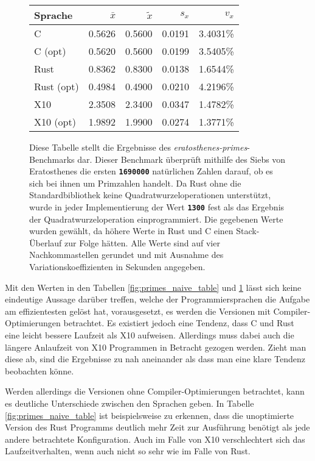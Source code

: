 \begin{figure}[hb]
	\begin{center}
		\begin{tabular}{lrrrr}
			\toprule
			Sprache    & $\bar{x}$ & $\tilde{x}$ & $s_x$ & $v_x$ \\
			\midrule
			C          & 0.5626 & 0.5600 & 0.0191 & 3.4031\% \\
			C (opt)    & 0.5620 & 0.5600 & 0.0199 & 3.5405\% \\
			Rust       & 0.8362 & 0.8300 & 0.0138 & 1.6544\% \\
			Rust (opt) & 0.4984 & 0.4900 & 0.0210 & 4.2196\% \\
			X10        & 2.3508 & 2.3400 & 0.0347 & 1.4782\% \\
			X10 (opt)  & 1.9892 & 1.9900 & 0.0274 & 1.3771\% \\
			\bottomrule
		\end{tabular}
	\end{center}
	\caption{
		Diese Tabelle stellt die Ergebnisse des \textit{eratosthenes-primes}-Benchmarks dar.
		Dieser Benchmark überprüft mithilfe des Siebs von Eratosthenes die ersten \texttt{\textsc{\textbf{1690000}}}
		natürlichen Zahlen darauf, ob es sich bei ihnen um Primzahlen handelt.
		Da Rust ohne die Standardbibliothek keine Quadratwurzeloperationen
		unterstützt, wurde in jeder Implementierung der Wert \texttt{\textsc{\textbf{1300}}} fest als das Ergebnis
		der Quadratwurzeloperation einprogrammiert.
		Die gegebenen Werte wurden gewählt, da höhere Werte in Rust und C einen Stack-Überlauf zur Folge hätten.
		Alle Werte sind auf vier Nachkommastellen gerundet und mit Ausnahme des Variationskoeffizienten
		in Sekunden angegeben.
	}
	\label{fig:primes_eratosthenes_table}
\end{figure}

Mit den Werten in den Tabellen \ref{fig:primes_naive_table} und \ref{fig:primes_eratosthenes_table} lässt sich keine
eindeutige Aussage darüber treffen, welche der Programmiersprachen die Aufgabe am effizientesten
gelöst hat, vorausgesetzt, es werden die Versionen mit Compiler-Optimierungen betrachtet. Es existiert
jedoch eine Tendenz, dass C und Rust eine leicht bessere Laufzeit als X10 aufweisen.
Allerdings muss dabei auch die längere Anlaufzeit von X10 Programmen in Betracht gezogen werden.
Zieht man diese ab, sind die Ergebnisse zu nah aneinander als dass man eine klare Tendenz beobachten könne.

Werden allerdings die Versionen ohne Compiler-Optimierungen betrachtet, kann es deutliche Unterschiede zwischen den
Sprachen geben. In Tabelle \ref{fig:primes_naive_table} ist beispielsweise zu erkennen, dass die unoptimierte
Version des Rust Programms deutlich mehr Zeit zur Ausführung benötigt als jede andere betrachtete
Konfiguration. Auch im Falle von X10 verschlechtert sich das Laufzeitverhalten, wenn auch nicht so
sehr wie im Falle von Rust.

